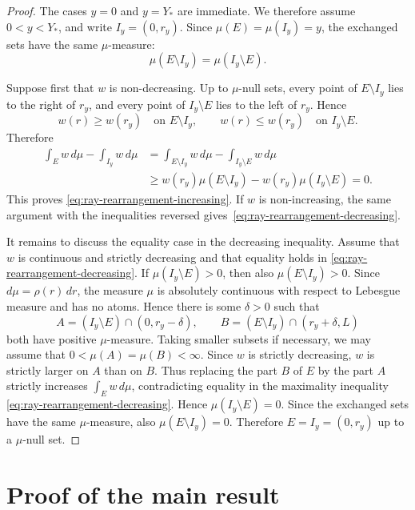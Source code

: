 \documentclass[11pt,letterpaper,reqno]{amsart}
\theoremstyle{definition}
\begin{document}
\begin{proof}
The cases \(y=0\) and \(y=Y_*\) are immediate. We therefore assume \(0<y<Y_*\), and write $I_y=(0,r_y)$. Since \(\mu(E)=\mu(I_y)=y\), the exchanged sets have the same \(\mu\)-measure:
\[
        \mu(E\setminus I_y)=\mu(I_y\setminus E).
\]

Suppose first that \(w\) is non-decreasing. Up to \(\mu\)-null sets, every point of \(E\setminus I_y\) lies to the right of \(r_y\), and every point of \(I_y\setminus E\) lies to the left of \(r_y\). Hence
\[
        w(r)\geq w(r_y)\quad\text{on }E\setminus I_y,
        \qquad
        w(r)\leq w(r_y)\quad\text{on }I_y\setminus E.
\]
Therefore
\[
\begin{aligned}
        \int_E w\,d\mu-\int_{I_y}w\,d\mu
        &=
        \int_{E\setminus I_y}w\,d\mu
        -
        \int_{I_y\setminus E}w\,d\mu \\
        &\geq
        w(r_y)\mu(E\setminus I_y)
        -
        w(r_y)\mu(I_y\setminus E)
        =0.
\end{aligned}
\]
This proves \eqref{eq:ray-rearrangement-increasing}. If \(w\) is non-increasing, the same argument with the inequalities reversed gives~\eqref{eq:ray-rearrangement-decreasing}.


It remains to discuss the equality case in the decreasing inequality. Assume that \(w\) is continuous and strictly decreasing and that equality holds in \eqref{eq:ray-rearrangement-decreasing}. If \(\mu(I_y\setminus E)>0\), then also \(\mu(E\setminus I_y)>0\). Since \(d\mu=\rho(r)\,dr\), the measure \(\mu\) is absolutely continuous with respect to Lebesgue measure and has no atoms. Hence there is some \(\delta>0\) such that
\[
        A=(I_y\setminus E)\cap (0,r_y-\delta),
        \qquad
        B=(E\setminus I_y)\cap (r_y+\delta,L)
\]
both have positive \(\mu\)-measure. Taking smaller subsets if necessary, we may assume that \(0<\mu(A)=\mu(B)<\infty\). Since \(w\) is strictly decreasing, \(w\) is strictly larger on \(A\) than on \(B\). Thus replacing the part \(B\) of \(E\) by the part \(A\) strictly increases \(\int_E w\,d\mu\), contradicting equality in the maximality inequality \eqref{eq:ray-rearrangement-decreasing}. Hence \(\mu(I_y\setminus E)=0\). Since the exchanged sets have the same \(\mu\)-measure, also \(\mu(E\setminus I_y)=0\). Therefore \(E=I_y=(0,r_y)\) up to a \(\mu\)-null set.
\end{proof}




\section{Proof of the main result}\label{sec:euclidean-proof}
\end{document}
